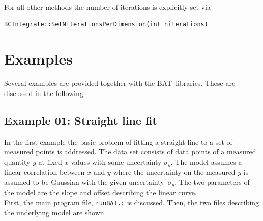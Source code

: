 \documentclass[11pt, a4paper]{article}
\newcommand{\BAT}{{\sc BAT}}
\begin{document}
\noindent 
For all other methods the number of iterations is explicitly set via 
%
\begin{verbatim}
BCIntegrate::SetNiterationsPerDimension(int niterations) 
\end{verbatim} 


\section{Examples}
\label{section:examples} 

Several examples are provided together with the \BAT\ libraries. These
are discussed in the following. 


\subsection{Example 01: Straight line fit} 

In the first example the basic problem of fitting a straight line to a
set of measured points is addressed. The data set consists of data
points of a measured quantity $y$ at fixed $x$ values with some
uncertainty $\sigma_{y}$. The model assumes a linear correlation
between $x$ and $y$ where the uncertainty on the measured $y$ is
assumed to be Gaussian with the given uncertainty~$\sigma_{y}$. The
two parameters of the model are the slope and offset describing the
linear curve. \\

\noindent 
First, the main program file, \verb|runBAT.c| is discussed. Then, the
two files describing the underlying model are shown. \\ 

\pagebreak 
\end{document}
